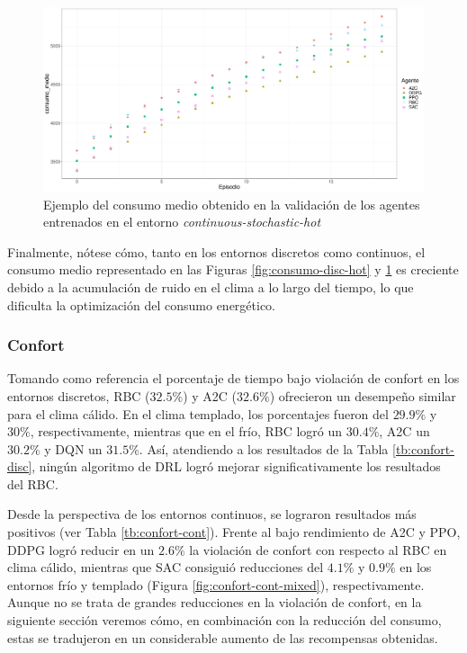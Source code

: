 \begin{figure}
    \centering
    \includegraphics[width=\textwidth]{imagenes/consumo-cont-hot.pdf}
    \caption{Ejemplo del consumo medio obtenido en la validación de los agentes entrenados en el entorno \textit{continuous-stochastic-hot}}
    \label{fig:consumo-cont-hot}
\end{figure}

Finalmente, nótese cómo, tanto en los entornos discretos como continuos, el consumo medio representado en las Figuras \ref{fig:consumo-disc-hot} y \ref{fig:consumo-cont-hot} es creciente debido a la acumulación de ruido en el clima a lo largo del tiempo, lo que dificulta la optimización del consumo energético.

\subsubsection{Confort}

Tomando como referencia el porcentaje de tiempo bajo violación de confort en los entornos discretos, RBC ($32.5\%$) y A2C ($32.6\%$) ofrecieron un desempeño similar para el clima cálido. En el clima templado, los porcentajes fueron del $29.9\%$ y $30\%$, respectivamente, mientras que en el frío, RBC logró un $30.4\%$, A2C un $30.2\%$ y DQN un $31.5\%$. Así, atendiendo a los resultados de la Tabla \ref{tb:confort-disc}, ningún algoritmo de DRL logró mejorar significativamente los resultados del RBC.

Desde la perspectiva de los entornos continuos, se lograron resultados más positivos (ver Tabla \ref{tb:confort-cont}). Frente al bajo rendimiento de A2C y PPO, DDPG logró reducir en un $2.6\%$ la violación de confort con respecto al RBC en clima cálido, mientras que SAC consiguió reducciones del $4.1\%$ y $0.9\%$ en los entornos frío y templado (Figura \ref{fig:confort-cont-mixed}), respectivamente. Aunque no se trata de grandes reducciones en la violación de confort, en la siguiente sección veremos cómo, en combinación con la reducción del consumo, estas se tradujeron en un considerable aumento de las recompensas obtenidas.

